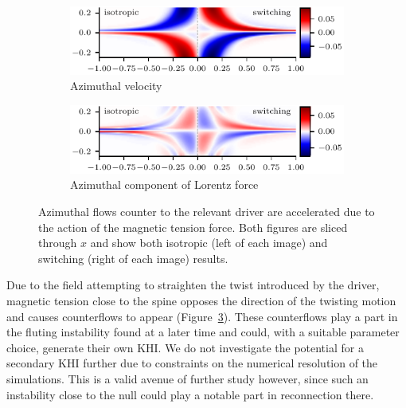 \begin{figure}[t]
  \centering
    \begin{subfigure}{0.49\textwidth}
      \includegraphics[width=\linewidth]{v-4r-4_counterflows_t_3}
      \caption{Azimuthal velocity}
      \label{fig:v-4r-4_counterflows_t_3}
    \end{subfigure}
    \hfill
    \begin{subfigure}{0.49\textwidth}
      \includegraphics[width=\linewidth]{v-4r-4_lorentz_counterflows_t_3}
      \caption{Azimuthal component of Lorentz force}
      \label{fig:v-4r-4_lorentz_counterflows_t_3}
    \end{subfigure}
\caption{Azimuthal flows counter to the relevant driver are accelerated due to the action of the magnetic tension force. Both figures are sliced through $x$ and show both isotropic (left of each image) and switching (right of each image) results.}
\label{fig:counterflows}%
\end{figure}

Due to the field attempting to straighten the twist introduced by the driver, magnetic tension close to the spine opposes the direction of the twisting motion and causes counterflows to appear (Figure~\ref{fig:counterflows}). These counterflows play a part in the fluting instability found at a later time and could, with a suitable parameter choice, generate their own KHI. We do not investigate the potential for a secondary KHI further due to constraints on the numerical resolution of the simulations. This is a valid avenue of further study however, since such an instability close to the null could play a notable part in reconnection there.


